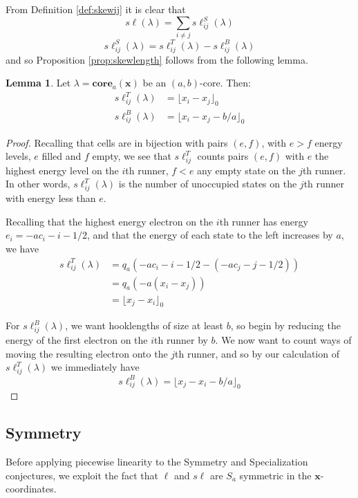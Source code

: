 \documentclass{amsart}[12pt]
\theoremstyle{definition}
\newtheorem{lemma}[dummy]{Lemma}
\newcommand{\core}{\mathbf{core}}
\newcommand{\sk}{s\ell}
\begin{document}
From Definition \ref{def:skewij} it is clear that
$$\sk(\lambda)=\sum_{i\neq j}\sk^S_{ij}(\lambda)$$
$$\sk_{ij}^S(\lambda)=\sk_{ij}^T(\lambda)-\sk^B_{ij}(\lambda)$$
and so Proposition \ref{prop:skewlength} follows from the following lemma.

\begin{lemma}
Let $\lambda=\core_a(\mathbf{x})$ be an $(a,b)$-core.  Then:
\begin{align*}
\sk_{ij}^T(\lambda)&=\lfloor x_i-x_j\rfloor_0 \\
\sk_{ij}^B(\lambda)&=\lfloor x_i-x_j-b/a\rfloor_0
\end{align*}
\end{lemma}

\begin{proof}
Recalling that cells are in bijection with pairs $(e, f)$, with $e>f$ energy levels, $e$ filled and $f$ empty, we see that $\sk^T_{ij}$ counts pairs $(e, f)$ with $e$ the highest energy level on the $i$th runner, $f<e$ any empty state on the $j$th runner.  In other words, $\sk^T_{ij}(\lambda)$ is the number of unoccupied states on the $j$th runner with energy less than $e$.

Recalling that the highest energy electron on the $i$th runner has energy $e_i=-ac_i-i-1/2$, and that the energy of each state to the left increases by $a$, we have  
\begin{align*}
\sk_{ij}^T(\lambda)&=q_a\left(-ac_i-i-1/2-(-ac_j-j-1/2)\right) \\
&=q_a(-a(x_i-x_j)) \\
&=\lfloor x_j-x_i\rfloor_0
\end{align*}

For $\sk_{ij}^B(\lambda)$, we want hooklengths of size at least $b$, so begin by reducing the energy of the first electron on the $i$th runner by $b$.  We now want to count ways of moving the resulting electron onto the $j$th runner, and so by our calculation of $\sk_{ij}^T(\lambda)$ we immediately have
$$\sk_{ij}^B(\lambda)=\lfloor x_j-x_i-b/a\rfloor_0$$
\end{proof}

\subsection{Symmetry}

Before applying piecewise linearity to the Symmetry and Specialization conjectures, we exploit the fact that $\ell$ and $\sk$ are $S_a$ symmetric in the $\mathbf{x}$-coordinates.
\end{document}

